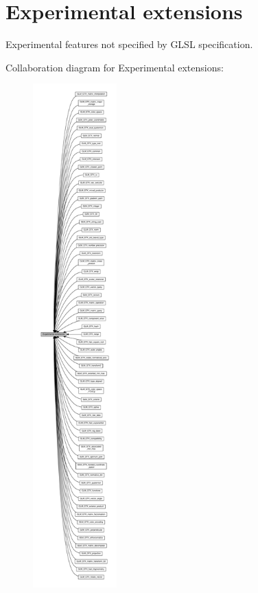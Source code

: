 \hypertarget{group__gtx}{}\section{Experimental extensions}
\label{group__gtx}


Experimental features not specified by G\+L\+SL specification.  


Collaboration diagram for Experimental extensions\+:
\nopagebreak
\begin{figure}[H]
\begin{center}
\leavevmode
\includegraphics[height=550pt]{d8/d93/group__gtx}
\end{center}
\end{figure}
